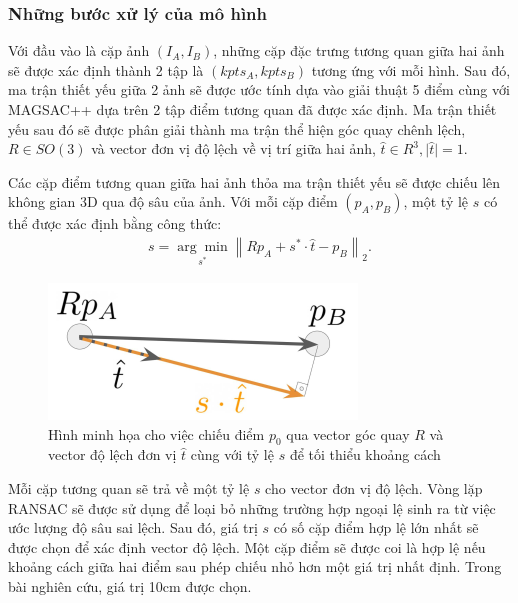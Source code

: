 \subsubsection*{Những bước xử lý của mô hình}

Với đầu vào là cặp ảnh $(I_A,I_B)$, những cặp đặc trưng tương quan giữa hai ảnh sẽ được xác định thành 2 tập là $(kpts_A, kpts_B)$ tương ứng với mỗi hình. Sau đó, ma trận thiết yếu giữa 2 ảnh sẽ được ước tính dựa vào giải thuật 5 điểm \cite{nister2004efficient} cùng với MAGSAC++ \cite{barath2020magsac++} dựa trên 2 tập điểm tương quan đã được xác định. Ma trận thiết yếu sau đó sẽ được phân giải thành ma trận thể hiện góc quay chênh lệch, $R \in SO(3)$ và vector đơn vị độ lệch về vị trí giữa hai ảnh, $\hat{t} \in R^{3}, \lvert \hat{t} \rvert = 1$.

Các cặp điểm tương quan giữa hai ảnh thỏa ma trận thiết yếu sẽ được chiếu lên không gian 3D qua độ sâu của ảnh. Với mỗi cặp điểm $(p_A,p_B)$, một tỷ lệ $s$ có thể được xác định bằng công thức:
$$
\begin{aligned}
    s=\underset{s^*}{\arg \min }\left\|R p_A+s^* \cdot \hat{t}-p_B\right\|_2 .
\end{aligned}
$$

\begin{figure}[H]
    \centering
    \includegraphics[scale=0.8]{pics/Proposal/reprojection.png}
    \caption[Minh họa cho việc xác định tỷ lệ $s$ bằng độ sâu ảnh]{Hình minh họa cho việc chiếu điểm $p_0$ qua vector góc quay $R$ và vector độ lệch đơn vị $\hat{t}$ cùng với tỷ lệ $s$ để tối thiểu khoảng cách \cite{arnold2022mapfree}}
\end{figure}


Mỗi cặp tương quan sẽ trả về một tỷ lệ $s$ cho vector đơn vị độ lệch. Vòng lặp RANSAC sẽ được sử dụng để loại bỏ những trường hợp ngoại lệ sinh ra từ việc ước lượng độ sâu sai lệch. Sau đó, giá trị $s$ có số cặp điểm hợp lệ lớn nhất sẽ được chọn để xác định vector độ lệch. Một cặp điểm sẽ được coi là hợp lệ nếu khoảng cách giữa hai điểm sau phép chiếu nhỏ hơn một giá trị nhất định. Trong bài nghiên cứu, giá trị 10cm được chọn.

